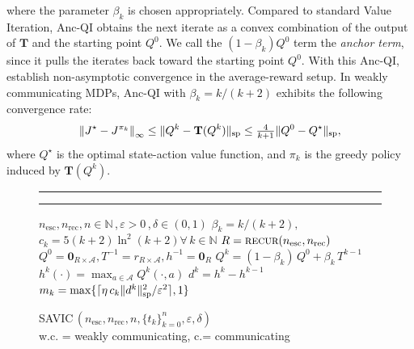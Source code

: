 \documentclass{article}
\theoremstyle{definition}
\theoremstyle{remark}
\newcommand{\cA}{\mathcal{A}}
\newcommand{\cS}{\mathcal{S}}
\newcommand{\T}{\mathbf{T}}
\newcommand{\NN}{\mathbb{N}}
\newcommand*{\infn}[1]{\left\|{#1}\right\|_{\infty}}
\renewcommand{\sp}[1]{\|{#1}\|_\text{\rm sp}}
\begin{document}
where the parameter $\beta_k$ is chosen appropriately. Compared to standard Value Iteration, Anc-QI obtains the next iterate as a convex combination of the output of $\T$ and the starting point $Q^0$. We call the $(1-\beta_k)Q^0$ term the \emph{anchor term}, since it pulls the iterates back toward the starting point $Q^0$. With this Anc-QI, \cite{sabach2017first, lee2025multi} establish non-asymptotic convergence in the average-reward setup. In weakly communicating MDPs, Anc-QI with $\beta_k=k/(k+2)$ exhibits the following convergence rate:
\[
 \infn{J^\star-J^{\pi_k}} \le \sp{Q^k-\T(Q^k)}
 \leq \mbox{$\frac{4}{k+1}$}\sp{Q^0-Q^\star},
\]
where $Q^{\star}$ is the optimal state-action value function, and $\pi_k$ is the greedy policy induced by $\T(Q^k)$. 
\begin{figure}
 \vspace{-.17in}
\captionsetup{type=algorithm}
\hrule
\vspace{2pt}
\begin{minipage}{0.6\textwidth}
\caption{\sc \mbox{SAVIC}\,$( n_{\mathrm{esc}},n_{\mathrm{rec}}, n, \{t_k\}^n_{k=0}, \varepsilon, \delta)$\\w.c. = weakly communicating, c.= communicating}
   \label{alg:SAVIC}
\vspace{-.1in}
\hrule
\begin{algorithmic}
      $n_{\mathrm{esc}},n_{\mathrm{rec}}, n\in\NN$\,,\,$\varepsilon>0$\,,\,$\delta\in(0,1)$ 
      $\beta_k=k/(k\!+\!2), $  $c_k=5(k\!+\!2)\ln^2(k\!+\!2) \forall \, k \in \NN$
\State $R=\mbox{\sc recur}(n_{\mathrm{esc}}, n_{\mathrm{rec}})$
\State{$\eta = \ln(8|R||\cA|(n\!+\!1)/\delta)$}
 \State $Q^0=\mathbf{0}_{R\times \cA}, T^{-1}=r_{R\times \cA}, h^{-1}=\mathbf{0}_R$   
     \State $Q^{k} =(1\!-\!\beta_k)\,Q^0+\beta_k\, T^{k-1}$
     \State $h^k(\cdot)= \max_{a\in \cA} Q^{k}(\cdot, a)$
     \State $d^k=h^k-h^{k-1}$
    \State $m_k= \max\{\lceil \eta\,c_k\sp{d^k}^2/\varepsilon^{2}\rceil,1\}$
\end{algorithmic}
\end{minipage}
\end{figure}
\end{document}
